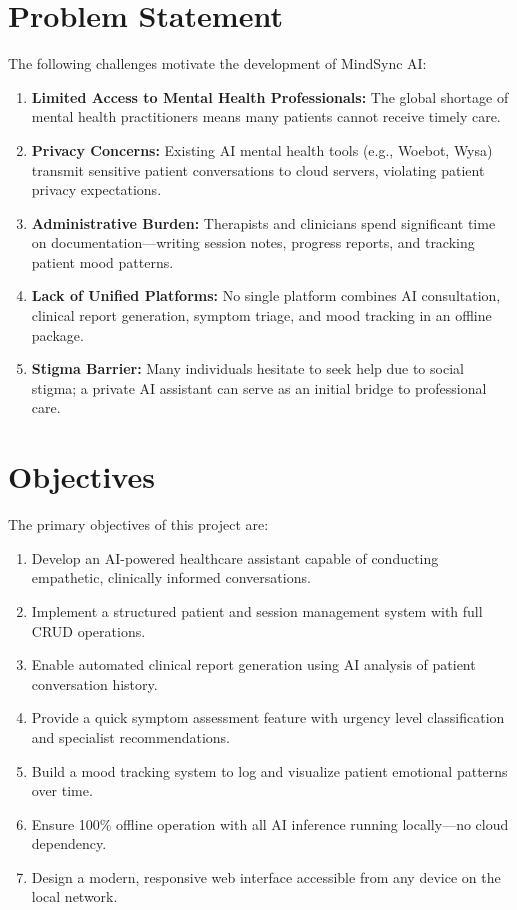 \documentclass[12pt,a4paper]{report}
\begin{document}
\section{Problem Statement}

The following challenges motivate the development of MindSync AI:

\begin{enumerate}[label=\arabic*.]
    \item \textbf{Limited Access to Mental Health Professionals:} The global shortage of mental health practitioners means many patients cannot receive timely care.
    \item \textbf{Privacy Concerns:} Existing AI mental health tools (e.g., Woebot, Wysa) transmit sensitive patient conversations to cloud servers, violating patient privacy expectations.
    \item \textbf{Administrative Burden:} Therapists and clinicians spend significant time on documentation---writing session notes, progress reports, and tracking patient mood patterns.
    \item \textbf{Lack of Unified Platforms:} No single platform combines AI consultation, clinical report generation, symptom triage, and mood tracking in an offline package.
    \item \textbf{Stigma Barrier:} Many individuals hesitate to seek help due to social stigma; a private AI assistant can serve as an initial bridge to professional care.
\end{enumerate}

\section{Objectives}

The primary objectives of this project are:

\begin{enumerate}[label=\arabic*.]
    \item Develop an AI-powered healthcare assistant capable of conducting empathetic, clinically informed conversations.
    \item Implement a structured patient and session management system with full CRUD operations.
    \item Enable automated clinical report generation using AI analysis of patient conversation history.
    \item Provide a quick symptom assessment feature with urgency level classification and specialist recommendations.
    \item Build a mood tracking system to log and visualize patient emotional patterns over time.
    \item Ensure 100\% offline operation with all AI inference running locally---no cloud dependency.
    \item Design a modern, responsive web interface accessible from any device on the local network.
\end{enumerate}
\end{document}
